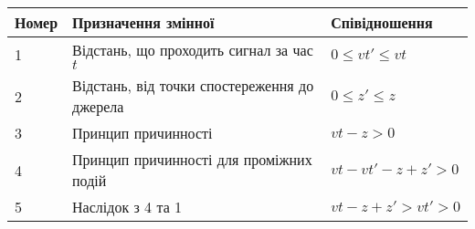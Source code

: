 %
\begin{tabular}{ | l | l | l | }
\hline Номер & Призначення змінної               & Співідношення             \\ \hline
1 & Відстань, що проходить сигнал за час $t$     & $ 0 \le vt' \le vt $      \\ \hline
2 & Відстань, від точки спостереження до джерела & $ 0 \le z' \le z $        \\ \hline
3 & Принцип причинності                          & $ vt - z > 0 $            \\ \hline
4 & Принцип причинності для проміжних подій      & $ vt - vt' - z + z' > 0 $ \\ \hline
5 & Наслідок з 4 та 1                            & $ vt - z + z' > vt' > 0 $ \\ \hline
\end{tabular}


